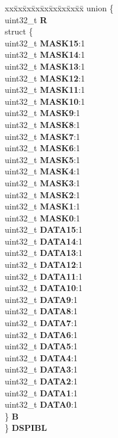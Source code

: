 \begin{DoxyCompactItemize}
\begin{tabbing}
\end{tabbing}\item 
\mbox{\label{structSIU__tag_a6038eb92bf662eae8b30edc4607e29c7}} 
\begin{tabbing}
xx\=xx\=xx\=xx\=xx\=xx\=xx\=xx\=xx\=\kill
union \{\\
\>uint32\_t {\bfseries R}\\
\>struct \{\\
\>\>uint32\_t {\bfseries MASK15}:1\\
\>\>uint32\_t {\bfseries MASK14}:1\\
\>\>uint32\_t {\bfseries MASK13}:1\\
\>\>uint32\_t {\bfseries MASK12}:1\\
\>\>uint32\_t {\bfseries MASK11}:1\\
\>\>uint32\_t {\bfseries MASK10}:1\\
\>\>uint32\_t {\bfseries MASK9}:1\\
\>\>uint32\_t {\bfseries MASK8}:1\\
\>\>uint32\_t {\bfseries MASK7}:1\\
\>\>uint32\_t {\bfseries MASK6}:1\\
\>\>uint32\_t {\bfseries MASK5}:1\\
\>\>uint32\_t {\bfseries MASK4}:1\\
\>\>uint32\_t {\bfseries MASK3}:1\\
\>\>uint32\_t {\bfseries MASK2}:1\\
\>\>uint32\_t {\bfseries MASK1}:1\\
\>\>uint32\_t {\bfseries MASK0}:1\\
\>\>uint32\_t {\bfseries DATA15}:1\\
\>\>uint32\_t {\bfseries DATA14}:1\\
\>\>uint32\_t {\bfseries DATA13}:1\\
\>\>uint32\_t {\bfseries DATA12}:1\\
\>\>uint32\_t {\bfseries DATA11}:1\\
\>\>uint32\_t {\bfseries DATA10}:1\\
\>\>uint32\_t {\bfseries DATA9}:1\\
\>\>uint32\_t {\bfseries DATA8}:1\\
\>\>uint32\_t {\bfseries DATA7}:1\\
\>\>uint32\_t {\bfseries DATA6}:1\\
\>\>uint32\_t {\bfseries DATA5}:1\\
\>\>uint32\_t {\bfseries DATA4}:1\\
\>\>uint32\_t {\bfseries DATA3}:1\\
\>\>uint32\_t {\bfseries DATA2}:1\\
\>\>uint32\_t {\bfseries DATA1}:1\\
\>\>uint32\_t {\bfseries DATA0}:1\\
\>\} {\bfseries B}\\
\} {\bfseries DSPIBL}\\


\end{tabbing}
\end{DoxyCompactItemize}
